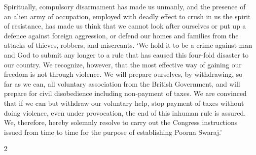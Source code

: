 \begin{multicols}{2}
Spiritually, compulsory disarmament has made us unmanly, and the presence of an alien army of occupation, employed with deadly effect to crush in us the spirit of resistance, has made us think that we cannot look after ourselves or put up a defence against foreign aggression, or defend our homes and families from the attacks of thieves, robbers, and miscreants. `We hold it to be a crime against man and God to submit any longer to a rule that has caused this four-fold disaster to our country. We recognize, however, that the most effective way of gaining our freedom is not through violence. We will prepare ourselves, by withdrawing, so far as we can, all voluntary association from the British Government, and will prepare for civil disobedience including non-payment of taxes. We are convinced that if we can but withdraw our voluntary help, stop payment of taxes without doing violence, even under provocation, the end of this inhuman rule is assured. We, therefore, hereby solemnly resolve to carry out the Congress instructions issued from time to time for the purpose of establishing Poorna Swaraj.'
\end{multicols}{2}
